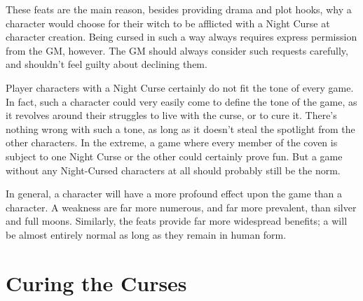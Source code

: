 These feats are the main reason, besides providing drama and plot hooks, why a character would choose for their witch to be afflicted with a Night Curse at character creation.
Being cursed in such a way always requires express permission from the GM, however.
The GM should always consider such requests carefully, and shouldn't feel guilty about declining them.

Player characters with a Night Curse certainly do not fit the tone of every game.
In fact, such a character could very easily come to define the tone of the game, as it revolves around their struggles to live with the curse, or to cure it.
There's nothing wrong with such a tone, as long as it doesn't steal the spotlight from the other characters.
In the extreme, a game where every member of the coven is subject to one Night Curse or the other could certainly prove fun.
But a game without any Night-Cursed characters at all should probably still be the norm.

In general, a {\vampire} character will have a more profound effect upon the game than a {\werewolf} character.
A {\vampirepossessive} weakness are far more numerous, and far more prevalent, than silver and full moons.
Similarly, the {\vampire} feats provide far more widespread benefits; a {\werewolf} will be almost entirely normal as long as they remain in human form.

\section{Curing the Curses}


